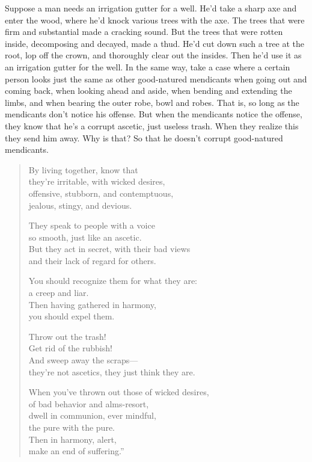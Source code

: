 \documentclass[12pt,openany]{book}%
\begin{document}
Suppose a man needs an irrigation gutter for a well. He’d take a sharp axe and enter the wood, where he’d knock various trees with the axe. The trees that were firm and substantial made a cracking sound. But the trees that were rotten inside, decomposing and decayed, made a thud. He’d cut down such a tree at the root, lop off the crown, and thoroughly clear out the insides. Then he’d use it as an irrigation gutter for the well. In the same way, take a case where a certain person looks just the same as other good-natured mendicants when going out and coming back, when looking ahead and aside, when bending and extending the limbs, and when bearing the outer robe, bowl and robes. That is, so long as the mendicants don’t notice his offense. But when the mendicants notice the offense, they know that he’s a corrupt ascetic, just useless trash. When they realize this they send him away. Why is that? So that he doesn’t corrupt good-natured mendicants. 

\begin{verse}%
By living together, know that \\
they’re irritable, with wicked desires, \\
offensive, stubborn, and contemptuous, \\
jealous, stingy, and devious. 

They speak to people with a voice \\
so smooth, just like an ascetic. \\
But they act in secret, with their bad views \\
and their lack of regard for others. 

You should recognize them for what they are: \\
a creep and liar. \\
Then having gathered in harmony, \\
you should expel them. 

Throw out the trash! \\
Get rid of the rubbish! \\
And sweep away the scraps—\\
they’re not ascetics, they just think they are. 

When you’ve thrown out those of wicked desires, \\
of bad behavior and alms-resort, \\
dwell in communion, ever mindful, \\
the pure with the pure. \\
Then in harmony, alert, \\
make an end of suffering.” 

%
\end{verse}
\end{document}
